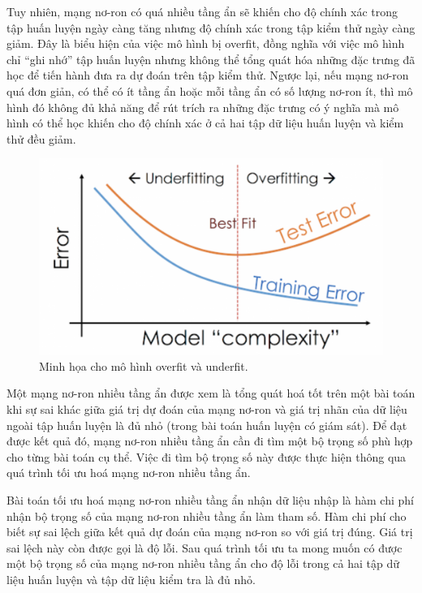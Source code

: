 Tuy nhiên, mạng nơ-ron có quá nhiều tầng ẩn sẽ khiến cho độ chính xác trong tập huấn luyện ngày càng tăng nhưng độ chính xác trong tập kiểm thử ngày càng giảm. Đây là biểu hiện của việc mô hình bị overfit, đồng nghĩa với việc mô hình chỉ ``ghi nhớ'' tập huấn luyện nhưng không thể tổng quát hóa những đặc trưng đã học để tiến hành đưa ra dự đoán trên tập kiểm thử. Ngược lại, nếu mạng nơ-ron quá đơn giản, có thể có ít tầng ẩn hoặc mỗi tầng ẩn có số lượng nơ-ron ít, thì mô hình đó không đủ khả năng để rút trích ra những đặc trưng có ý nghĩa mà mô hình có thể học khiến cho độ chính xác ở cả hai tập dữ liệu huấn luyện và kiểm thử đều giảm. 

\begin{figure}[htp]
\centering
\includegraphics[width=100 mm]{images/under-over.png}
\caption{Minh họa cho mô hình overfit và underfit. \cite{underoverfit}}
\label{fig:under-over}
\end{figure}

Một mạng nơ-ron nhiều tầng ẩn được xem là tổng quát hoá tốt trên một bài toán khi sự sai khác giữa giá trị dự đoán của mạng nơ-ron và giá trị nhãn của dữ liệu ngoài tập huấn luyện là đủ nhỏ (trong bài toán huấn luyện có giám sát). Để đạt được kết quả đó, mạng nơ-ron nhiều tầng ẩn cần đi tìm một bộ trọng số phù hợp cho từng bài toán cụ thể. Việc đi tìm bộ trọng số này được thực hiện thông qua quá trình tối ưu hoá mạng nơ-ron nhiều tầng ẩn.

Bài toán tối ưu hoá mạng nơ-ron nhiều tầng ẩn nhận dữ liệu nhập là hàm chi phí nhận bộ trọng số của mạng nơ-ron nhiều tầng ẩn làm tham số. Hàm chi phí cho biết sự sai lệch giữa kết quả dự đoán của mạng nơ-ron so với giá trị đúng. Giá trị sai lệch này còn được gọi là độ lỗi. Sau quá trình tối ưu ta mong muốn có được một bộ trọng số của mạng nơ-ron nhiều tầng ẩn cho độ lỗi trong cả hai tập dữ liệu huấn luyện và tập dữ liệu kiểm tra là đủ nhỏ.

